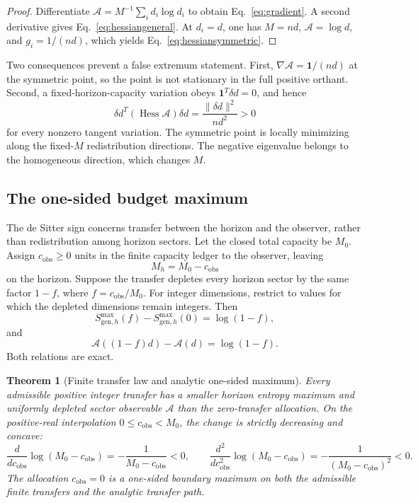 \documentclass[11pt]{article}
\newtheorem{theorem}{Theorem}[section]
\theoremstyle{remark}
\newcommand{\one}{\mathbf 1}
\newcommand{\Hess}{\operatorname{Hess}}
\begin{document}
\begin{proof}
Differentiate \(\mathcal A=M^{-1}\sum_i d_i\log d_i\) to obtain
Eq.~\eqref{eq:gradient}. A second derivative gives
Eq.~\eqref{eq:hessiangeneral}. At \(d_i=d\), one has
\(M=nd\), \(\mathcal A=\log d\), and \(g_i=1/(nd)\), which yields
Eq.~\eqref{eq:hessiansymmetric}.
\end{proof}

Two consequences prevent a false extremum statement. First,
\(\nabla\mathcal A=\one/(nd)\) at the symmetric point, so the point is not
stationary in the full positive orthant. Second, a fixed-horizon-capacity
variation obeys \(\one^T\delta d=0\), and hence
\[
\delta d^T(\Hess\mathcal A)\delta d
=\frac{\|\delta d\|^2}{nd^2}>0
\]
for every nonzero tangent variation. The symmetric point is locally
minimizing along the fixed-\(M\) redistribution directions. The negative
eigenvalue belongs to the homogeneous direction, which changes \(M\).

\subsection{The one-sided budget maximum}

The de Sitter sign concerns transfer between the horizon and the observer,
rather than redistribution among horizon sectors. Let the closed total
capacity be \(M_0\). Assign \(c_{\mathrm{obs}}\geq0\) units in the finite
capacity ledger to the observer, leaving
\[
M_h=M_0-c_{\mathrm{obs}}
\]
on the horizon. Suppose the transfer depletes every horizon sector by the
same factor \(1-f\), where \(f=c_{\mathrm{obs}}/M_0\). For integer dimensions, restrict to
values for which the depleted dimensions remain integers. Then
\begin{equation}
S_{\mathrm{gen},h}^{\max}(f)-S_{\mathrm{gen},h}^{\max}(0)
=\log(1-f),
\label{eq:entropydrop}
\end{equation}
and
\begin{equation}
\mathcal A((1-f)d)-\mathcal A(d)
=\log(1-f).
\label{eq:areadrop}
\end{equation}
Both relations are exact.

\begin{theorem}[Finite transfer law and analytic one-sided maximum]
\label{thm:transfersign}
Every admissible positive integer transfer has a smaller horizon entropy
maximum and uniformly depleted sector observable \(\mathcal A\) than the zero-transfer
allocation. On the positive-real interpolation
\(0\leq c_{\mathrm{obs}}<M_0\), the change is strictly decreasing and concave:
\[
\frac{d}{dc_{\mathrm{obs}}}\log(M_0-c_{\mathrm{obs}})
=-\frac1{M_0-c_{\mathrm{obs}}}<0,
\qquad
\frac{d^2}{dc_{\mathrm{obs}}^2}\log(M_0-c_{\mathrm{obs}})
=-\frac1{(M_0-c_{\mathrm{obs}})^2}<0.
\]
The allocation \(c_{\mathrm{obs}}=0\) is a one-sided boundary maximum on both
the admissible finite transfers and the analytic transfer path.
\end{theorem}
\end{document}
